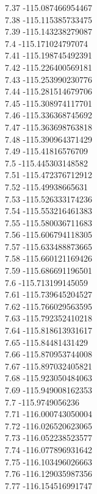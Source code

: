 {7.37	-115.087466954467\\
7.38	-115.115385733475\\
7.39	-115.143238279087\\
7.4	-115.171024797074\\
7.41	-115.198745492391\\
7.42	-115.226400569181\\
7.43	-115.253990230776\\
7.44	-115.281514679706\\
7.45	-115.308974117701\\
7.46	-115.336368745692\\
7.47	-115.363698763818\\
7.48	-115.390964371429\\
7.49	-115.41816576709\\
7.5	-115.445303148582\\
7.51	-115.472376712912\\
7.52	-115.49938665631\\
7.53	-115.526333174236\\
7.54	-115.553216461383\\
7.55	-115.580036711683\\
7.56	-115.606794118305\\
7.57	-115.633488873665\\
7.58	-115.660121169426\\
7.59	-115.686691196501\\
7.6	-115.713199145059\\
7.61	-115.739645204527\\
7.62	-115.766029563595\\
7.63	-115.792352410218\\
7.64	-115.818613931617\\
7.65	-115.84481431429\\
7.66	-115.870953744008\\
7.67	-115.897032405821\\
7.68	-115.923050484063\\
7.69	-115.949008162353\\
7.7	-115.9749056236\\
7.71	-116.000743050004\\
7.72	-116.026520623065\\
7.73	-116.052238523577\\
7.74	-116.077896931642\\
7.75	-116.103496026663\\
7.76	-116.129035987356\\
7.77	-116.154516991747\\
}
